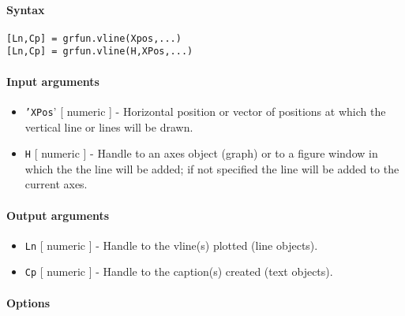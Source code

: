 


	\paragraph{Syntax}

\begin{verbatim}
[Ln,Cp] = grfun.vline(Xpos,...)
[Ln,Cp] = grfun.vline(H,XPos,...)
\end{verbatim}

\paragraph{Input arguments}

\begin{itemize}
\item
  \texttt{'XPos}' {[} numeric {]} - Horizontal position or vector of
  positions at which the vertical line or lines will be drawn.
\item
  \texttt{H} {[} numeric {]} - Handle to an axes object (graph) or to a
  figure window in which the the line will be added; if not specified
  the line will be added to the current axes.
\end{itemize}

\paragraph{Output arguments}

\begin{itemize}
\item
  \texttt{Ln} {[} numeric {]} - Handle to the vline(s) plotted (line
  objects).
\item
  \texttt{Cp} {[} numeric {]} - Handle to the caption(s) created (text
  objects).
\end{itemize}

\paragraph{Options}

